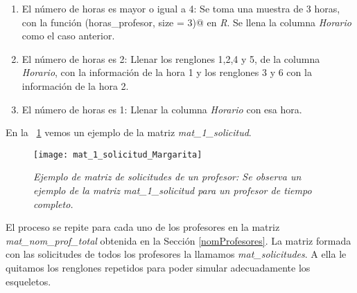 \begin{enumerate}
\begin{enumerate}
\item El número de horas es mayor o igual a 4: Se toma una muestra de 3 horas, con la función \verb@sample(horas_profesor, size = 3)@ en \textit{R}. Se llena la columna \textit{Horario} como el caso anterior.

\item El número de horas es 2: Llenar los renglones 1,2,4 y 5, de la columna \textit{Horario}, con la información de la hora 1 y los renglones 3 y 6 con la información de la hora 2.

\item El número de horas es 1: Llenar la columna \textit{Horario} con esa hora.
\end{enumerate}
\end{enumerate}

En la \figurename{~\ref{mat_1_solicitud_Margarita}} vemos un ejemplo de la matriz \textit{mat\_1\_solicitud}.

\begin{figure}[H]
\centering
\texttt{[image: mat\_1\_solicitud\_Margarita]} %
\caption[\textit{Ejemplo de matriz de solicitudes de un profesor}]{\textit{Ejemplo de matriz de solicitudes de un profesor: Se observa un ejemplo de la matriz mat\_1\_solicitud para un profesor de tiempo completo.}}\label{mat_1_solicitud_Margarita}
\end{figure}

El proceso se repite para cada uno de los profesores en la matriz \textit{mat\_nom\_prof\_total} obtenida en la Sección \ref{nomProfesores}. La matriz formada con las solicitudes de todos los profesores la llamamos \textit{mat\_solicitudes}. A ella le quitamos los renglones repetidos para poder simular adecuadamente los esqueletos.
